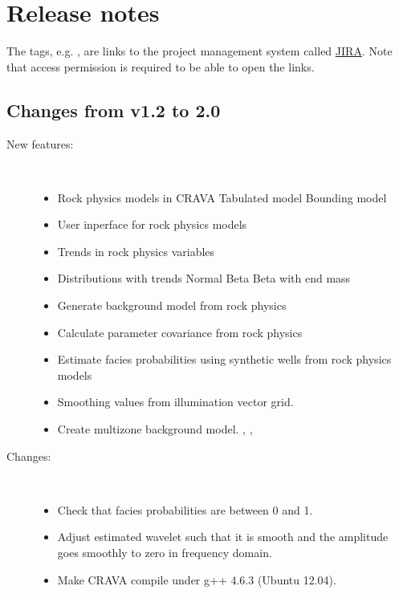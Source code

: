 \chapter{Release notes}
The tags, e.g. , are links to the \crava project management
system called
\href{http://www.atlassian.com/software/jira/}{JIRA}.
 Note that access permission is
required to be able to open the links.

\section{Changes from v1.2 to 2.0}

\begin{description}
\item [New features:] \mbox{ }
  \begin{itemize}
    \item Rock physics models in CRAVA
      \subitem Tabulated model
      \subitem Bounding model
    \item User inperface for rock physics models
    \item Trends in rock physics variables
    \item Distributions with trends
      \subitem Normal
      \subitem Beta
      \subitem Beta with end mass
    \item Generate background model from rock physics
    \item Calculate parameter covariance from rock physics
    \item Estimate facies probabilities using synthetic wells from rock physics models
    \item Smoothing values from illumination vector grid. 
    \item Create multizone background model. ,  , 
 \end{itemize}

\item [Changes:] \mbox{ }
  \begin{itemize}
   \item Check that facies probabilities are between 0 and 1. 
   \item Adjust estimated wavelet such that it is smooth and the amplitude goes smoothly to zero in frequency domain. 
   \item Make CRAVA compile under g++ 4.6.3 (Ubuntu 12.04). 
 \end{itemize}


\end{description}
